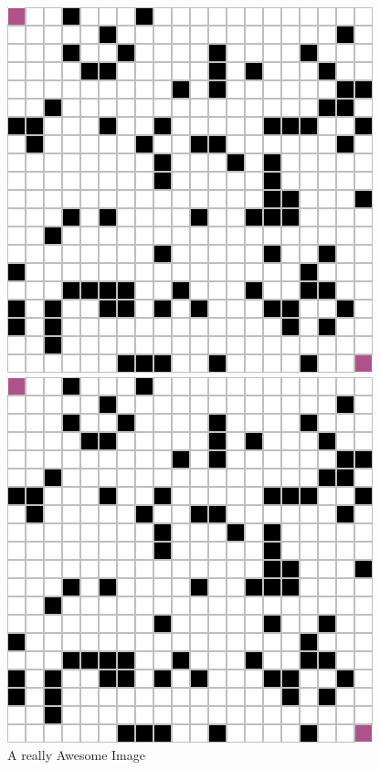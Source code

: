 \documentclass[letter]{article}
\begin{document}
\begin{questions}
	\begin{figure}
		\includegraphics[width=\linewidth]{../pics/question2-1.png}
		\caption{A really Awesome Image}\label{fig:awesome_image1}
		\endminipage\hfill
		\includegraphics[width=\linewidth]{../pics/question2-1.png}

\end{figure}
\end{questions}
\end{document}
